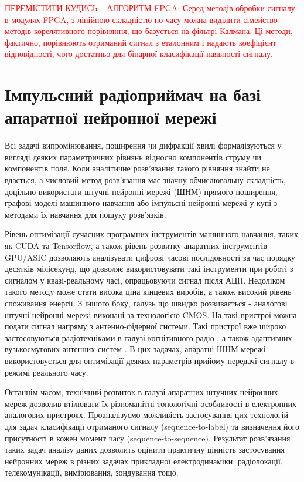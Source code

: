 \textcolor{red}{ ПЕРЕМІСТИТИ КУДИСЬ -- АЛГОРИТМ FPGA:
Серед методів обробки сигналу в модулях FPGA, з лінійною складністю по часу 
можна виділити сімейство методів корелятивного порівняння, що 
базується на фільтрі Калмана. Ці методи, фактично, порівнюють отриманий сигнал 
з еталонним і надають коефіцієнт відповідності, чого достатньо для бінарної
класифікації наявності сигналу. }

\section{Імпульсний радіоприймач на базі апаратної нейронної мережі}

Всі задачі випромінювання, поширення чи дифракції хвилі формалізуються
у вигляді деяких параметричних рівнянь відносно компонентів струму чи 
компонентів поля. Коли аналітичне розв'язання такого рівняння знайти не 
вдається, а числовий метод розв'язання має значну обчислювальну складність, 
доцільно використати штучні нейронні мережі (ШНМ) прямого поширення, графові 
моделі машинного навчання або імпульсні нейронні мережі у купі з методами їх 
навчання для пошуку розв'язків.

Рівень оптимізації сучасних програмних інструментів машинного навчання, таких 
як CUDA та Tensorflow, а також рівень розвитку апаратних інструментів GPU/ASIC
дозволяють аналізувати цифрові часові послідовності за час порядку 
десятків мілісекунд, що дозволяє використовувати такі інструменти при роботі 
з сигналом у квазі-реальному часі, опрацьовуючи сигнал після АЦП. Недоліком 
такого методу може стати висока ціна кінцевих виробів, а також високий 
рівень споживання енергії. З іншого боку, галузь що швидко розвивається - 
аналогові штучні нейронні мережі виконані за технологією CMOS. На такі 
пристрої можна подати сигнал напряму з антенно-фідерної системи. Такі 
пристрої вже широко застосовуються радіотехніками в галузі когнітивного 
радіо \cite{imp:Husseini2010}, а також адаптивних вузькосмугових антенних 
систем \cite{imp:Zbynek2002}. В цих задачах, апаратні ШНМ мережі 
використовується для оптимізації деяких параметрів прийому-передачі сигналу 
в режимі реального часу.

Останнім часом, технічний розвиток в галузі апаратних штучних нейронних мереж 
дозволив втілювати їх різноманітні топологічні особливості в електронних 
аналогових пристроях. Проаналізуємо можливість застосування цих технологій для 
задач класифікації отриманого сигналу (sequence-to-label) та визначення його 
присутності в кожен момент часу (sequence-to-sequence). Результат розв'язання 
таких задач аналізу даних дозволить оцінити практичну цінність застосування 
нейронних мереж в різних задачах прикладної електродинаміки: радіолокації, 
телекомунікації, вимірювання, зондування тощо. 

